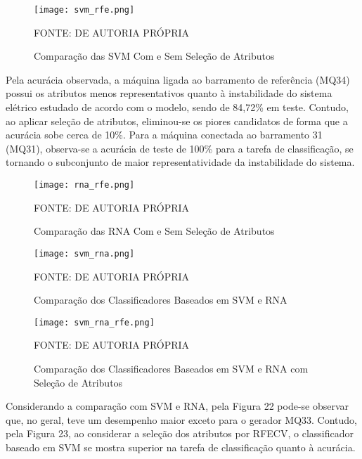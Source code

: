 \documentclass[12pt,oneside,a4paper,chapter=TITLE,section=TITLE,sumario=tradicional,english,brazil]{abntex2}
\begin{document}
\begin{figure}[ht!]
\centering
\caption{Comparação das SVM Com e Sem Seleção de Atributos}
\par
\texttt{[image: svm\_rfe.png]}
\centering
\par
FONTE: DE AUTORIA PRÓPRIA
\end{figure}
Pela acurácia observada, a máquina ligada ao barramento de referência (MQ34) possui os atributos menos representativos quanto à instabilidade do sistema elétrico estudado de acordo com o modelo, sendo de 84,72\% em teste. Contudo, ao aplicar seleção de atributos, eliminou-se os piores candidatos de forma que a acurácia sobe cerca de 10\%. Para a máquina conectada ao barramento 31 (MQ31), observa-se a acurácia de teste de 100\% para a tarefa de classificação, se tornando o subconjunto de maior representatividade da instabilidade do sistema.\par 
\begin{figure}[ht!]
\centering
\caption{Comparação das RNA Com e Sem Seleção de Atributos}
\par
\texttt{[image: rna\_rfe.png]}
\centering
\par
FONTE: DE AUTORIA PRÓPRIA
\end{figure}


\begin{figure}[ht!]
\centering
\caption{Comparação dos Classificadores Baseados em SVM e RNA}
\par
\texttt{[image: svm\_rna.png]}
\centering
\par
FONTE: DE AUTORIA PRÓPRIA
\end{figure}
\par 
\newpage
\begin{figure}[ht!]
\centering
\caption{Comparação dos Classificadores Baseados em SVM e RNA com Seleção de Atributos}
\par
\texttt{[image: svm\_rna\_rfe.png]}
\centering
\par
FONTE: DE AUTORIA PRÓPRIA
\end{figure}
\par
Considerando a comparação com SVM e RNA, pela Figura 22 pode-se observar que, no geral, teve um desempenho maior exceto para o gerador MQ33. Contudo, pela Figura 23, ao considerar a seleção dos atributos por RFECV, o classificador baseado em SVM se mostra superior na tarefa de classificação quanto à acurácia.
\par
\end{document}
